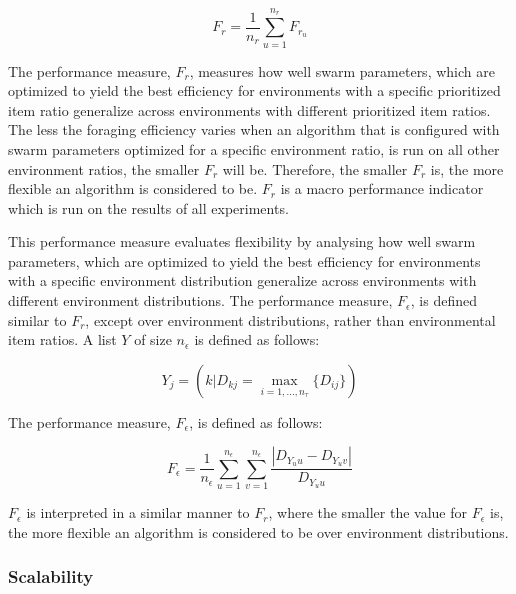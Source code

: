 \documentclass[preprint,12pt]{elsarticle}
\begin{document}
\begin{equation}
F_r = \dfrac{1}{n_r}\sum_{u=1}^{n_r} F_{r_u}
\end{equation}

The performance measure, $F_r$, measures how well swarm parameters, which are optimized to yield the best efficiency for environments with a specific prioritized item ratio generalize across environments with different prioritized item ratios. The less the foraging efficiency varies when an algorithm that is configured with swarm parameters optimized for a specific environment ratio, is run on all other environment ratios, the smaller $F_r$ will be. Therefore, the smaller $F_r$ is, the more flexible an algorithm is considered to be. $F_r$ is a macro performance indicator which is run on the results of all experiments. 




This performance measure evaluates flexibility by analysing how well swarm parameters, which are optimized to yield the best efficiency for environments with a specific environment distribution generalize across environments with different environment distributions. The performance measure, $F_{\epsilon}$, is defined similar to $F_r$, except over environment distributions, rather than environmental item ratios. A list $Y$ of size $n_\epsilon$ is defined as follows:

\begin{equation}
Y_j = ( k | D_{kj} = \max_{i=1,...,n_\tau}\{D_{ij}\} )
\end{equation}

The performance measure, $F_\epsilon$, is defined as follows:

\begin{equation}
F_\epsilon = \dfrac{1}{n_\epsilon}\sum_{u=1}^{n_\epsilon} \sum_{v=1}^{n_\epsilon}\dfrac{|D_{Y_uu}- D_{Y_uv}|}{D_{Y_uu}}
\end{equation}

$F_\epsilon$ is interpreted in a similar manner to $F_r$, where the smaller the value for $F_\epsilon$ is, the more flexible an algorithm is considered to be over environment distributions.

\subsubsection{Scalability}
\label{setup:scalability}
\end{document}
